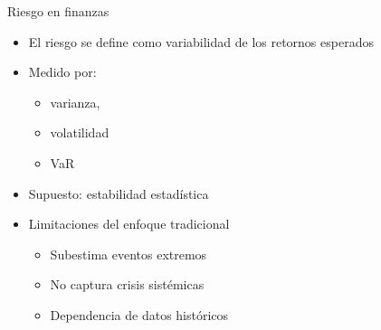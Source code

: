 \documentclass{beamer}
\begin{document}
\begin{frame}{Riesgo en finanzas}

    \begin{itemize}
        \item El riesgo se define como variabilidad de los retornos esperados
        \vspace{0.3cm}
        \item Medido por: 
        \begin{itemize}
            \item varianza, 
            \item volatilidad
            \item VaR
        \end{itemize}
        \vspace{0.3cm}
        \item Supuesto: estabilidad estadística    
        \vspace{0.3cm}
        \item Limitaciones del enfoque tradicional
        \begin{itemize}
            \item Subestima eventos extremos
            \item No captura crisis sistémicas
            \item Dependencia de datos históricos
        \end{itemize}
\end{itemize} 
    
\end{frame}
\end{document}
